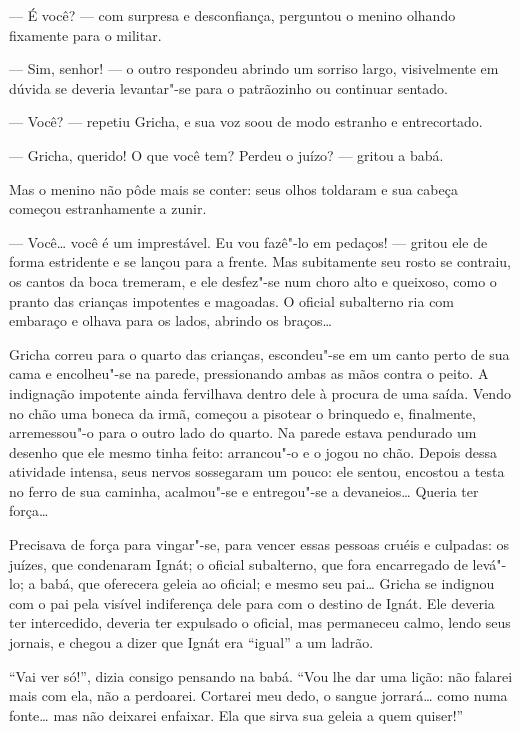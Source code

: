 --- É você? --- com surpresa e desconfiança, perguntou o menino olhando
fixamente para o militar.

--- Sim, senhor! --- o outro respondeu abrindo um sorriso largo,
visivelmente em dúvida se deveria levantar"-se para o patrãozinho ou
continuar sentado.

--- Você? --- repetiu Gricha, e sua voz soou de modo estranho e
entrecortado.

--- Gricha, querido! O que você tem? Perdeu o juízo? --- gritou a babá.

Mas o menino não pôde mais se conter: seus olhos toldaram e sua cabeça começou estranhamente a zunir.

--- Você\ldots{} você é um imprestável. Eu vou fazê"-lo em pedaços! --- gritou
ele de forma estridente e se lançou para a frente. Mas subitamente seu
rosto se contraiu, os cantos da boca tremeram, e ele desfez"-se num choro
alto e queixoso, como o pranto das crianças impotentes e magoadas. O oficial
subalterno ria com embaraço e olhava para os lados, abrindo os braços\ldots{}

Gricha correu para o quarto das crianças, escondeu"-se em um canto perto
de sua cama e encolheu"-se na parede, pressionando ambas as mãos contra o
peito. A indignação impotente ainda fervilhava dentro dele à procura de
uma saída. Vendo no chão uma boneca da irmã, começou a pisotear o
brinquedo e, finalmente, arremessou"-o para o outro lado do quarto. Na
parede estava pendurado um desenho que ele mesmo tinha feito: arrancou"-o
e o jogou no chão. Depois dessa atividade intensa, seus nervos
sossegaram um pouco: ele sentou, encostou a testa no ferro de sua
caminha, acalmou"-se e entregou"-se a devaneios\ldots{} Queria ter força\ldots{}

Precisava de força para vingar"-se, para vencer essas pessoas cruéis e
culpadas: os juízes, que condenaram Ignát; o oficial subalterno, que
fora encarregado de levá"-lo; a babá, que oferecera geleia ao oficial; e
mesmo seu pai\ldots{} Gricha se indignou com o pai pela visível indiferença
dele para com o destino de Ignát. Ele deveria ter intercedido, deveria
ter expulsado o oficial, mas permaneceu calmo, lendo seus jornais, e
chegou a dizer que Ignát era ``igual'' a um ladrão.

``Vai ver só!'', dizia consigo pensando na babá. ``Vou lhe dar uma
lição: não falarei mais com ela, não a perdoarei. Cortarei meu dedo, o
sangue jorrará\ldots{} como numa fonte\ldots{} mas não deixarei enfaixar. Ela que
sirva sua geleia a quem quiser!''

